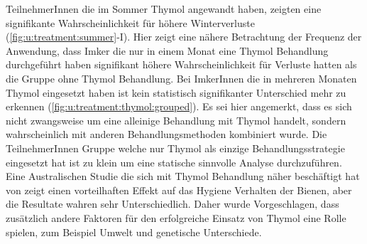 TeilnehmerInnen die im Sommer Thymol angewandt haben, zeigten eine signifikante Wahrscheinlichkeit für höhere Winterverluste (\cref{fig:u:treatment:summer}-I). Hier zeigt eine nähere Betrachtung der Frequenz der Anwendung, dass Imker die nur in einem Monat eine Thymol Behandlung durchgeführt haben signifikant höhere Wahrscheinlichkeit für Verluste hatten als die Gruppe ohne Thymol Behandlung. Bei ImkerInnen die in mehreren Monaten Thymol eingesetzt haben ist kein statistisch signifikanter Unterschied mehr zu erkennen (\cref{fig:u:treatment:thymol:grouped}). Es sei hier angemerkt, dass es sich nicht zwangsweise um eine alleinige Behandlung mit Thymol handelt, sondern wahrscheinlich mit anderen Behandlungsmethoden kombiniert wurde. Die TeilnehmerInnen Gruppe welche nur Thymol als einzige Behandlungsstrategie eingesetzt hat ist zu klein um eine statische sinnvolle Analyse durchzuführen.
\newline
Eine Australischen Studie die sich mit Thymol Behandlung näher beschäftigt hat von \cite{colin2019} zeigt einen vorteilhaften Effekt auf das Hygiene Verhalten der Bienen, aber die Resultate wahren sehr Unterschiedlich. Daher wurde Vorgeschlagen, dass zusätzlich andere Faktoren für den erfolgreiche Einsatz von Thymol eine Rolle spielen, zum Beispiel Umwelt und genetische Unterschiede.


